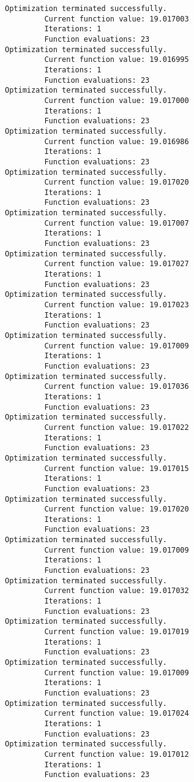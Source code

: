 \documentclass[11pt]{article}
\begin{document}
\begin{Verbatim}[commandchars=\\\{\}]
Optimization terminated successfully.
         Current function value: 19.017003
         Iterations: 1
         Function evaluations: 23
Optimization terminated successfully.
         Current function value: 19.016995
         Iterations: 1
         Function evaluations: 23
Optimization terminated successfully.
         Current function value: 19.017000
         Iterations: 1
         Function evaluations: 23
Optimization terminated successfully.
         Current function value: 19.016986
         Iterations: 1
         Function evaluations: 23
Optimization terminated successfully.
         Current function value: 19.017020
         Iterations: 1
         Function evaluations: 23
Optimization terminated successfully.
         Current function value: 19.017007
         Iterations: 1
         Function evaluations: 23
Optimization terminated successfully.
         Current function value: 19.017027
         Iterations: 1
         Function evaluations: 23
Optimization terminated successfully.
         Current function value: 19.017023
         Iterations: 1
         Function evaluations: 23
Optimization terminated successfully.
         Current function value: 19.017009
         Iterations: 1
         Function evaluations: 23
Optimization terminated successfully.
         Current function value: 19.017036
         Iterations: 1
         Function evaluations: 23
Optimization terminated successfully.
         Current function value: 19.017022
         Iterations: 1
         Function evaluations: 23
Optimization terminated successfully.
         Current function value: 19.017015
         Iterations: 1
         Function evaluations: 23
Optimization terminated successfully.
         Current function value: 19.017020
         Iterations: 1
         Function evaluations: 23
Optimization terminated successfully.
         Current function value: 19.017009
         Iterations: 1
         Function evaluations: 23
Optimization terminated successfully.
         Current function value: 19.017032
         Iterations: 1
         Function evaluations: 23
Optimization terminated successfully.
         Current function value: 19.017019
         Iterations: 1
         Function evaluations: 23
Optimization terminated successfully.
         Current function value: 19.017009
         Iterations: 1
         Function evaluations: 23
Optimization terminated successfully.
         Current function value: 19.017024
         Iterations: 1
         Function evaluations: 23
Optimization terminated successfully.
         Current function value: 19.017012
         Iterations: 1
         Function evaluations: 23

\end{Verbatim}
\end{document}
